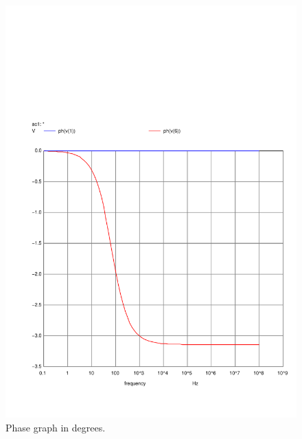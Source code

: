 \begin{figure}[H] \centering
    \includegraphics[width=0.6\linewidth, trim={2cm 1.5cm 0.5cm 6cm}, clip]{../Simulation/acph.pdf}
    \caption{Phase graph in degrees.}
    \label{fig:FreqPhNg}
\end{figure}
